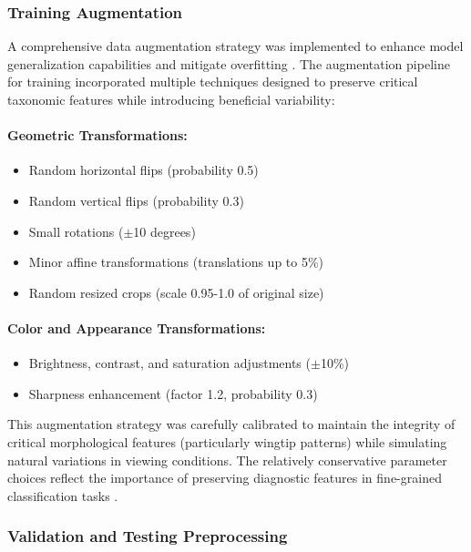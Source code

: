 \subsubsection{Training Augmentation}

A comprehensive data augmentation strategy was implemented to enhance model generalization capabilities and mitigate overfitting \citep{shorten2019survey}. The augmentation pipeline for training incorporated multiple techniques designed to preserve critical taxonomic features while introducing beneficial variability:

\paragraph{Geometric Transformations:}
\begin{itemize}
    \item Random horizontal flips (probability 0.5)
    \item Random vertical flips (probability 0.3)
    \item Small rotations ($\pm$10 degrees)
    \item Minor affine transformations (translations up to 5\%)
    \item Random resized crops (scale 0.95-1.0 of original size)
\end{itemize}

\paragraph{Color and Appearance Transformations:}
\begin{itemize}
    \item Brightness, contrast, and saturation adjustments ($\pm$10\%)
    \item Sharpness enhancement (factor 1.2, probability 0.3)
\end{itemize}

This augmentation strategy was carefully calibrated to maintain the integrity of critical morphological features (particularly wingtip patterns) while simulating natural variations in viewing conditions. The relatively conservative parameter choices reflect the importance of preserving diagnostic features in fine-grained classification tasks \citep{wang2022bird}.

\subsubsection{Validation and Testing Preprocessing}

